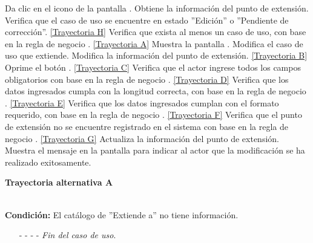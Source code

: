 	\begin{UCtrayectoria}
		\UCpaso[\UCactor] Da clic en el icono \editar de la pantalla .
		\UCpaso[\UCsist] Obtiene la información del punto de extensión.
		\UCpaso[\UCsist] Verifica que el caso de uso se encuentre en estado ''Edición'' o ''Pendiente de corrección''. \hyperlink{CU12-1-6-2:TAH}{[Trayectoria H]}
		\UCpaso[\UCsist] Verifica que exista al menos un caso de uso, con base en la regla de negocio . \hyperlink{CU12-1-6-2:TAA}{[Trayectoria A]}
		\UCpaso[\UCsist] Muestra la pantalla .
		\UCpaso[\UCactor] Modifica el caso de uso que extiende. 
		\UCpaso[\UCsist] Modifica la información del punto de extensión. \hyperlink{CU12-1-6-2:TAB}{[Trayectoria B]} \label{CU12.1.6.2-P4}
		\UCpaso[\UCactor] Oprime el botón . \hyperlink{CU12-1-6-2:TAC}{[Trayectoria C]} \label{CU12.1.6.2-P6}
		\UCpaso[\UCsist] Verifica que el actor ingrese todos los campos obligatorios con base en la regla de negocio . \hyperlink{CU12-1-6-2:TAD}{[Trayectoria D]}
		\UCpaso[\UCsist] Verifica que los datos ingresados cumpla con la longitud correcta, con base en la regla de negocio . \hyperlink{CU12-1-6-2:TAE}{[Trayectoria E]}
		\UCpaso[\UCsist] Verifica que los datos ingresados cumplan con el formato requerido, con base en la regla de negocio . \hyperlink{CU12-1-6-2:TAF}{[Trayectoria F]}
		\UCpaso[\UCsist] Verifica que el punto de extensión no se encuentre registrado en el sistema con base en la regla de negocio . \hyperlink{CU12-1-6-2:TAG}{[Trayectoria G]} 
		\UCpaso[\UCsist] Actualiza la información del punto de extensión.
		\UCpaso[\UCsist] Muestra el mensaje  en la pantalla  para indicar al actor que la modificación se ha realizado exitosamente.
	\end{UCtrayectoria}		
\hypertarget{CU12-1-6-2:TAA}{\textbf{Trayectoria alternativa A}}\\
\noindent \textbf{Condición:} El catálogo de ''Extiende a'' no tiene información.
\begin{enumerate}
	\UCpaso[\UCsist] Muestra el mensaje  en la pantalla  para indicar que no existen casos de uso registrados.
	\item[- -] - - {\em {Fin del caso de uso}}.%
\end{enumerate}
